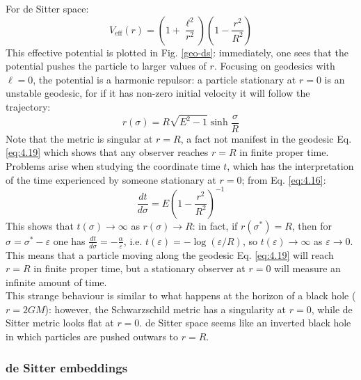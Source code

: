 For de Sitter space:
\begin{equation*}
  V_{\text{eff}}(r) = \left( 1 + \frac{\ell^2}{r^2} \right) \left( 1 - \frac{r^2}{R^2} \right)
\end{equation*}
This effective potential is plotted in Fig. \ref{geo-ds}: immediately, one sees that the potential pushes the particle to larger values of $ r $. Focusing on geodesics with $ \ell = 0 $, the potential is a harmonic repulsor: a particle stationary at $ r = 0 $ is an unstable geodesic, for if it has non-zero initial velocity it will follow the trajectory:
\begin{equation}
  r(\sigma) = R \sqrt{E^2 - 1} \sinh \frac{\sigma}{R}
  \label{eq:4.19}
\end{equation}
Note that the metric is singular at $ r = R $, a fact not manifest in the geodesic Eq. \ref{eq:4.19} which shows that any observer reaches $ r = R $ in finite proper time. Problems arise when studying the coordinate time $ t $, which has the interpretation of the time experienced by someone stationary at $ r = 0 $; from Eq. \ref{eq:4.16}:
\begin{equation*}
  \frac{dt}{d\sigma} = E \left( 1 - \frac{r^2}{R^2} \right)^{-1}
\end{equation*}
This shows that $ t(\sigma) \rightarrow \infty $ as $ r(\sigma) \rightarrow R $: in fact, if $ r(\sigma^*) = R $, then for $ \sigma = \sigma^* - \varepsilon $ one has $ \frac{dt}{d\sigma} = - \frac{\alpha}{\varepsilon} $, i.e. $ t(\varepsilon) = - \log (\varepsilon / R) $, so $ t(\varepsilon) \rightarrow \infty $ as $ \varepsilon \rightarrow 0 $. This means that a particle moving along the geodesic Eq. \ref{eq:4.19} will reach $ r = R $ in finite proper time, but a stationary observer at $ r = 0 $ will measure an infinite amount of time.\\
This strange behaviour is similar to what happens at the horizon of a black hole ($ r = 2GM $): however, the Schwarzschild metric has a singularity at $ r = 0 $, while de Sitter metric looks flat at $ r = 0 $. de Sitter space seems like an inverted black hole in which particles are pushed outwars to $ r = R $.

\subsubsection{de Sitter embeddings}

